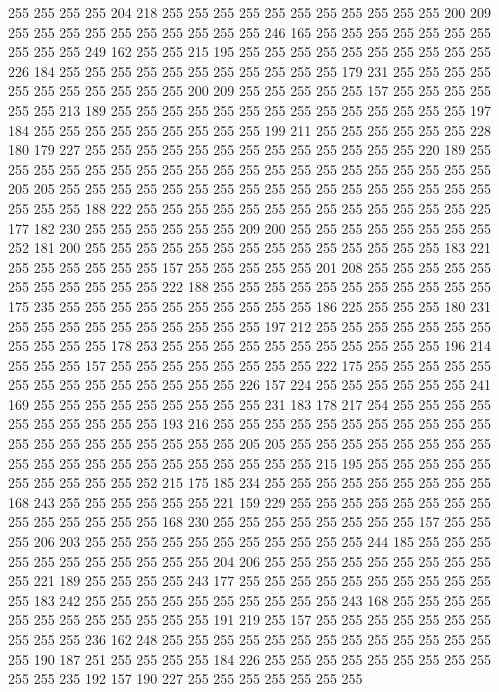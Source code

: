 255 255 255 255 204 218 255 255 255 255 255 255 255 255 255 255 255 200 209 255
255 255 255 255 255 255 255 255 255 246 165 255 255 255 255 255 255 255 255 255
255 249 162 255 255 215 195 255 255 255 255 255 255 255 255 255 255 226 184 255
255 255 255 255 255 255 255 255 255 255 179 231 255 255 255 255 255 255 255 255
255 255 255 200 209 255 255 255 255 255 157 255 255 255 255 255 255 213 189 255
255 255 255 255 255 255 255 255 255 255 255 255 255 197 184 255 255 255 255 255
255 255 255 255 199 211 255 255 255 255 255 255 228 180 179 227 255 255 255 255
255 255 255 255 255 255 255 255 255 220 189 255 255 255 255 255 255 255 255 255
255 255 255 255 255 255 255 255 255 255 255 205 205 255 255 255 255 255 255 255
255 255 255 255 255 255 255 255 255 255 255 255 255 188 222 255 255 255 255 255
255 255 255 255 255 255 255 255 225 177 182 230 255 255 255 255 255 255 209 200
255 255 255 255 255 255 255 255 252 181 200 255 255 255 255 255 255 255 255 255
255 255 255 255 255 183 221 255 255 255 255 255 255 157 255 255 255 255 255 201
208 255 255 255 255 255 255 255 255 255 255 255 222 188 255 255 255 255 255 255
255 255 255 255 255 175 235 255 255 255 255 255 255 255 255 255 255 186 225 255
255 255 180 231 255 255 255 255 255 255 255 255 255 255 197 212 255 255 255 255
255 255 255 255 255 255 255 178 253 255 255 255 255 255 255 255 255 255 255 255
196 214 255 255 255 157 255 255 255 255 255 255 255 255 222 175 255 255 255 255
255 255 255 255 255 255 255 255 255 255 226 157 224 255 255 255 255 255 255 241
169 255 255 255 255 255 255 255 255 255 231 183 178 217 254 255 255 255 255 255
255 255 255 255 255 193 216 255 255 255 255 255 255 255 255 255 255 255 255 255
255 255 255 255 255 255 255 205 205 255 255 255 255 255 255 255 255 255 255 255
255 255 255 255 255 255 255 255 255 215 195 255 255 255 255 255 255 255 255 255
255 252 215 175 185 234 255 255 255 255 255 255 255 255 255 168 243 255 255 255
255 255 255 221 159 229 255 255 255 255 255 255 255 255 255 255 255 255 255 255
168 230 255 255 255 255 255 255 255 255 157 255 255 255 206 203 255 255 255 255
255 255 255 255 255 255 255 244 185 255 255 255 255 255 255 255 255 255 255 255
204 206 255 255 255 255 255 255 255 255 255 255 221 189 255 255 255 255 243 177
255 255 255 255 255 255 255 255 255 255 255 183 242 255 255 255 255 255 255 255
255 255 255 243 168 255 255 255 255 255 255 255 255 255 255 255 255 191 219 255
157 255 255 255 255 255 255 255 255 255 255 236 162 248 255 255 255 255 255 255
255 255 255 255 255 255 255 255 190 187 251 255 255 255 255 184 226 255 255 255
255 255 255 255 255 255 255 255 235 192 157 190 227 255 255 255 255 255 255 255
